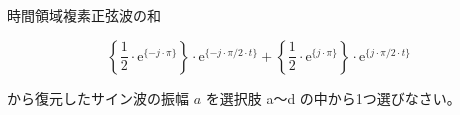 時間領域複素正弦波の和

\[
\left \{ \frac{1}{2} \cdot \textrm{e}^{\{-j \cdot \pi \}} \right \} \cdot \textrm{e}^{\{-j \cdot \pi/2 \cdot t \}} +  
\left \{ \frac{1}{2} \cdot \textrm{e}^{\{ j \cdot \pi \}} \right \} \cdot \textrm{e}^{\{ j \cdot \pi/2 \cdot t \}}
\]

\bigskip
\noindent から復元したサイン波の振幅 $a$ を選択肢 a〜d の中から1つ選びなさい。
